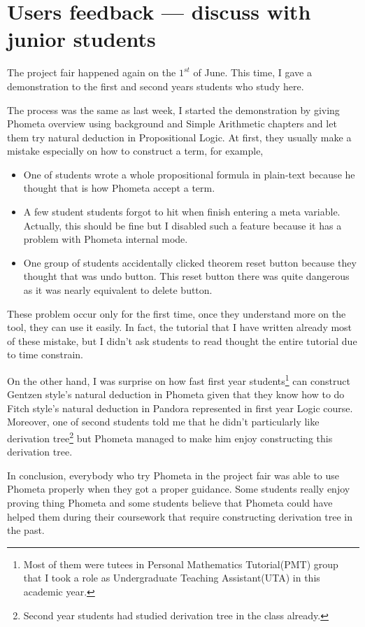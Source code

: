 \documentclass[master.tex]{subfiles}
\begin{document}
\section{Users feedback --- discuss with junior students}

The project fair happened again on the $1^{st}$ of June. This time, I gave a
demonstration to the first and second years students who study here.

The process was the same as last week, I started the demonstration by giving
Phometa overview using background and Simple Arithmetic chapters and let them
try natural deduction in Propositional Logic. At first, they usually
make a mistake especially on how to construct a term, for example,
\begin{itemize}
\item One of students wrote a whole propositional formula in plain-text because
  he thought that is how Phometa accept a term.
\item A few student students forgot to hit  when finish entering
  a meta variable. Actually, this should be fine but I disabled such a feature
  because it has a problem with Phometa internal mode.
\item One group of students accidentally clicked theorem reset button because
  they thought that was undo button. This reset button there was quite dangerous
  as it was nearly equivalent to delete button.
\end{itemize}
These problem occur only for the first time, once they understand more on the
tool, they can use it easily. In fact, the tutorial that I have written already
most of these mistake, but I didn't ask students to read thought the entire
tutorial due to time constrain.

On the other hand, I was surprise on how fast first year students\footnote{Most
  of them were tutees in Personal Mathematics Tutorial(PMT) group that I took a
  role as Undergraduate Teaching Assistant(UTA) in this academic year.} can
construct Gentzen style's natural deduction in Phometa given that they know how
to do Fitch style's natural deduction in Pandora represented in first year Logic
course. Moreover, one of second students told me that he didn't particularly
like derivation tree\footnote{Second year students had studied derivation tree
  in the class already.} but Phometa managed to make him enjoy constructing this
derivation tree.

In conclusion, everybody who try Phometa in the project fair was able to use
Phometa properly when they got a proper guidance. Some students really enjoy
proving thing Phometa and some students believe that Phometa could have helped
them during their coursework that require constructing derivation tree in the
past.
\end{document}
